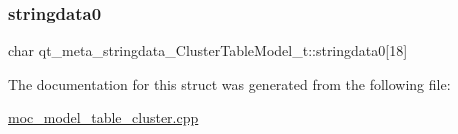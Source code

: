 \subsubsection{\texorpdfstring{stringdata0}{stringdata0}}
{\footnotesize\ttfamily char qt\+\_\+meta\+\_\+stringdata\+\_\+\+Cluster\+Table\+Model\+\_\+t\+::stringdata0\mbox{[}18\mbox{]}}



The documentation for this struct was generated from the following file\+:\begin{DoxyCompactItemize}
\item 
\hyperlink{moc__model__table__cluster_8cpp}{moc\+\_\+model\+\_\+table\+\_\+cluster.\+cpp}\end{DoxyCompactItemize}
